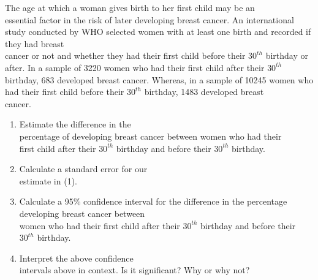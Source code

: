 \documentclass[11pt, chapterprefix=true]{scrbook}\usepackage[]{graphicx}\usepackage[]{color}
\begin{document}
\begin{exercises}
  \begin{exercise} %

The age at which a woman gives birth to her first child may be an  \\ essential factor in the risk of later  developing breast cancer.  An international study conducted by WHO selected women  with at least one birth and recorded if they had breast \\ cancer or not and whether they had their first child before their $30^{th}$ birthday or after. In a sample of 3220 women who had their first child after their $30^{th}$ birthday, 683 developed breast cancer.  Whereas, in a sample of 10245 women who had their first child before their $30^{th}$ birthday, 1483 developed breast \\ cancer.

	  \begin{enumerate}
	  \item Estimate the difference in the \\ percentage of developing breast cancer  between  women who had their \\ first  child after their $30^{th}$ birthday and before their  $30^{th}$ birthday.
    \item Calculate a standard error for our \\ estimate in (1).
    \item Calculate a 95\% confidence interval for the difference in the percentage \\ developing breast cancer  between   \\ women who had their first  child after their $30^{th}$  birthday and before their \\ $30^{th}$ birthday.
    \item Interpret the above confidence \\ intervals above in context.  Is it significant? Why or why not?
	  \end{enumerate}
  \end{exercise}
  \begin{solution}  %


\end{solution}
\end{exercises}
\end{document}
